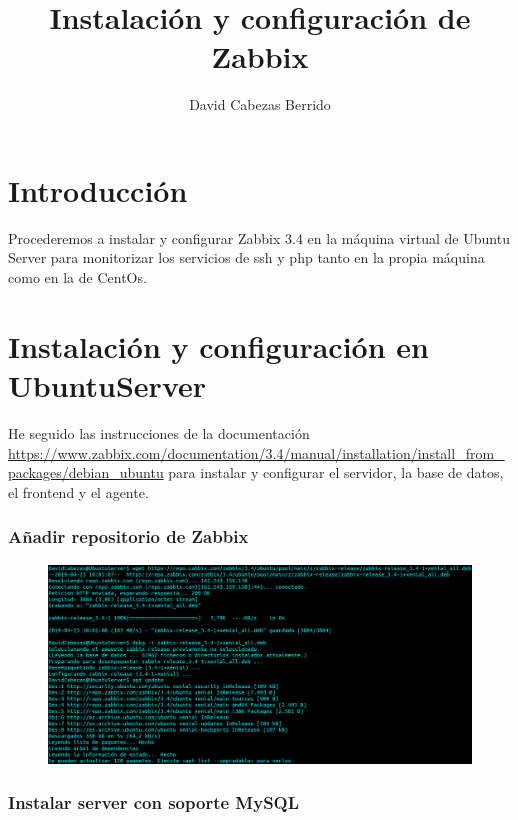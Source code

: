 \documentclass{article}
\begin{document}
\title{Instalación y configuración de Zabbix}
\author{David Cabezas Berrido}
\date{}
\maketitle
\tableofcontents

\newpage

\section{Introducción}

Procederemos a instalar y configurar Zabbix 3.4 en la máquina virtual
de Ubuntu Server para monitorizar los servicios de ssh y php
tanto en la propia máquina como en la de CentOs.

\section{Instalación y configuración en UbuntuServer}

He seguido las instrucciones de la documentación
\url{https://www.zabbix.com/documentation/3.4/manual/installation/install_from_packages/debian_ubuntu}
para instalar y configurar el servidor, la base de datos, el frontend
y el agente.

\subsubsection*{Añadir repositorio de Zabbix}

\begin{figure}[H]
  \includegraphics[width=160mm]{screenshots/paquetes}
\end{figure}

\subsubsection*{Instalar server con soporte MySQL}
\end{document}
